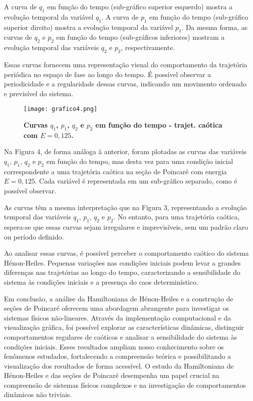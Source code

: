 \documentclass[a4paper,12pt]{article}
\begin{document}
A curva de $q_1$ em função do tempo (sub-gráfico superior esquerdo) mostra a evolução temporal da variável $q_1$. A curva de $p_1$ em função do tempo (sub-gráfico superior direito) mostra a evolução temporal da variável $p_1$. Da mesma forma, as curvas de $q_2$ e $p_2$ em função do tempo (sub-gráficos inferiores) mostram a evolução temporal das variáveis $q_2$ e $p_2$, respectivamente.

Essas curvas fornecem uma representação visual do comportamento da trajetória periódica no espaço de fase ao longo do tempo. É possível observar a periodicidade e a regularidade dessas curvas, indicando um movimento ordenado e previsível do sistema.



\begin{figure}[H]
\centering
\texttt{[image: grafico4.png]}
\caption{\textbf{Curvas $q_1$, $p_1$, $q_2$ e $p_2$ em função do tempo - trajet. caótica com $E = 0,125$.}}
\end{figure}

Na Figura 4, de forma análoga à anterior, foram plotadas as curvas das variáveis $q_1$, $p_1$, $q_2$ e $p_2$ em função do tempo, mas desta vez para uma condição inicial correspondente a uma trajetória caótica na seção de Poincaré com energia $E = 0,125$. Cada variável é representada em um sub-gráfico separado, como é possível observar.

As curvas têm a mesma interpretação que na Figura 3, representando a evolução temporal das variáveis $q_1$, $p_1$, $q_2$ e $p_2$. No entanto, para uma trajetória caótica, espera-se que essas curvas sejam irregulares e imprevisíveis, sem um padrão claro ou período definido.

Ao analisar essas curvas, é possível perceber o comportamento caótico do sistema Hénon-Heiles. Pequenas variações nas condições iniciais podem levar a grandes diferenças nas trajetórias ao longo do tempo, caracterizando a sensibilidade do sistema às condições iniciais e a presença do caos determinístico.

Em conclusão, a análise da Hamiltoniana de Hénon-Heiles e a construção de seções de Poincaré oferecem uma abordagem abrangente para investigar os sistemas físicos não-lineares. Através da implementação computacional e da visualização gráfica, foi possível explorar as características dinâmicas, distinguir comportamentos regulares de caóticos e analisar a sensibilidade do sistema às condições iniciais. Esses resultados ampliam nosso conhecimento sobre os fenômenos estudados, fortalecendo a compreensão teórica e possibilitando a visualização dos resultados de forma acessível. O estudo da Hamiltoniana de Hénon-Heiles e das seções de Poincaré desempenha um papel crucial na compreensão de sistemas físicos complexos e na investigação de comportamentos dinâmicos não triviais.
\end{document}

